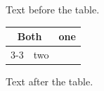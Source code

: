 \documentclass[12pt]{article}
\begin{document}
Text before the table.

\begin{tabular}{|l|l|l|}\hline \multicolumn{2}{|c|}{\multirow{2}{*}{Both}} & one\\\cline{3-3} \multicolumn{2}{|c|}{} & two\\\hline\end{tabular}

Text after the table.
\end{document}

